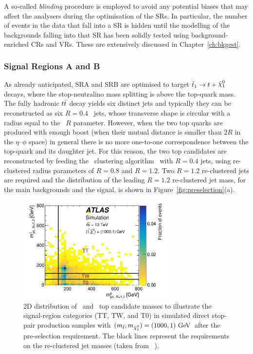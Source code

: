 			A so-called \emph{blinding} procedure is employed to avoid any potential biases that may affect the analysers during the optimisation of the \acp{SR}. In particular, the number of events in the data that fall into a \ac{SR} is hidden until the modelling of the backgrounds falling into that \ac{SR} has been solidly tested using background-enriched \acp{CR} and \acp{VR}. These are extensively discussed in Chapter~\ref{ch:bkgest}.
			
			


			\subsubsection*{Signal Regions A and B}

				As already anticipated, SRA and SRB are optimised to target $\stopone \to t + \ninoone$ decays, where the stop-neutralino mass splitting is above the top-quark mass. The fully hadronic $t\bar{t}$ decay yields six distinct jets and typically they can be reconstructed as six $R=0.4$ \antikt\ jets, whose transverse shape is circular with a radius equal to the \antikt\ $R$ parameter. However, when the two top quarks are produced with enough boost (when their mutual distance is smaller than $2R$ in the $\eta$--$\phi$ space) in general there is no more one-to-one correspondence between the top-quark and its daughter jet. For this reason, the two top candidates are reconstructed by feeding the \antikt\ clustering algorithm~\cite{Antikt2008} with $R=0.4$ jets, using re-clustered radius parameters of $R=0.8$ and $R=1.2$. Two $R=1.2$ re-clustered jets are required and the distribution of the leading $R=1.2$ re-clustered jet mass, for the main backgrounds and the signal, is shown in Figure~\ref{fig:preselection}(a).

				\begin{figure}[!htb]
				  \begin{center}
				   \includegraphics[width=0.7\textwidth]{figures/stop/SRA/CategoryDefs}
				   \caption{2D distribution of \mantikttwelvezero\ and \mantikttwelveone\ top candidate masses to illustrate the signal-region categories (TT, TW, and T0) in simulated direct stop-pair production samples with $(m_{\stop},m_{\ninoone})=(1000,1) \GeV$ after the pre-selection requirement. The black lines represent the requirements on the re-clustered jet masses (taken from ~\cite{stop0L}).}
				   \label{fig:categories}
				  \end{center}
				\end{figure}

